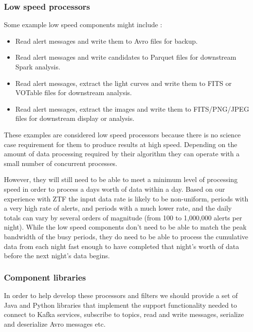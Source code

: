 \documentclass{article}
\newcommand{\avro} {Avro\xspace}
\newcommand{\fits} {FITS\xspace}
\newcommand{\parquet} {Parquet\xspace}
\newcommand{\votable} {VOTable\xspace}
\newcommand{\kafka} {Kafka\xspace}
\newcommand{\spark} {Spark\xspace}
\newcommand{\serz}      {serialize\xspace}
\newcommand{\deserz}    {deserialize\xspace}
\newcommand{\ztf} {ZTF\xspace}
\begin{document}
\subsubsection{Low speed processors}
\label{stage-2.low-speed.processors}

Some example low speed components might include :
\begin{itemize}
  \item Read alert messages and write them to \avro files for backup.
  \item Read alert messages and write candidates to \parquet files for downstream \spark analysis.
  \item Read alert messages, extract the light curves and write them to \fits or \votable files for downstream analysis.
  \item Read alert messages, extract the images and write them to FITS/PNG/JPEG files for downstream display or analysis.
\end{itemize}

These examples are considered low speed processors because there is no science case requirement for them to produce results at high speed. Depending on the amount of data processing required by their algorithm they can operate with a small number of concurrent processes.

However, they will still need to be able to meet a minimum level of processing speed in order to process a days worth of data within a day. Based on our experience with \ztf the input data rate is likely to be non-uniform, periods with a very high rate of alerts, and periods with a much lower rate, and the daily totals can vary by several orders of magnitude (from 100 to 1,000,000 alerts per night).
While the low speed components don't need to be able to match the peak bandwidth of the busy periods, they do need to be able to process the cumulative data from each night fast enough to have completed that night's worth of data before the next night's data begins.

\subsubsection{Component libraries}
\label{stage-2.component-libraries}

In order to help develop these processors and filters we should provide a set of Java and Python libraries that implement the support functionality needed to connect to \kafka services, subscribe to topics, read and write messages, \serz and \deserz \avro messages etc.
\end{document}
